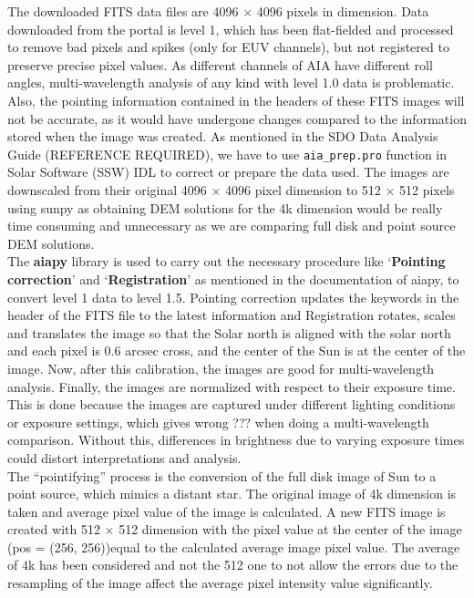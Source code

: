 The downloaded FITS data files are 4096 $\times$ 4096 pixels in dimension. Data downloaded from the portal is level 1, which has been flat-fielded and processed to remove bad pixels and spikes (only for EUV channels), but not registered to preserve precise pixel values. As different channels of AIA have different roll angles, multi-wavelength analysis of any kind with level 1.0 data is problematic. Also, the pointing information contained in the headers of these FITS images will not be accurate, as it would have undergone changes compared to the information stored when the image was created. As mentioned in the SDO Data Analysis Guide (REFERENCE REQUIRED), we have to use \texttt{aia\_prep.pro} function in Solar Software (SSW) IDL to correct or prepare the data used. The images are downscaled from their original 4096 $\times$ 4096 pixel dimension to 512 $\times$ 512 pixels using sunpy as obtaining DEM solutions for the 4k dimension would be really time consuming and unnecessary as we are comparing full disk and point source DEM solutions.\\

The \textbf{aiapy} library is used to carry out the necessary procedure like `\textbf{Pointing correction}' and `\textbf{Registration}' as mentioned in the documentation of aiapy, to convert level 1 data to level 1.5. Pointing correction updates the keywords in the header of the FITS file to the latest information and Registration rotates, scales and translates the image so that the Solar north is aligned with the solar north and each pixel is 0.6 arcsec cross, and the center of the Sun is at the center of the image. Now, after this calibration, the images are good for multi-wavelength analysis. Finally, the images are normalized with respect to their exposure time. This is done because the images are captured under different lighting conditions or exposure settings, which gives wrong ??? when doing a multi-wavelength comparison. Without this, differences in brightness due to varying exposure times could distort interpretations and analysis.\\

The ``pointifying'' process is the conversion of the full disk image of Sun to a point source, which mimics a distant star. The original image of 4k dimension is taken and average pixel value of the image is calculated. A new FITS image is created with 512 $\times$ 512 dimension with the pixel value at the center of the image (pos = (256, 256))equal to the calculated average image pixel value. The average of 4k has been considered and not the 512 one to not allow the errors due to the resampling of the image affect the average pixel intensity value significantly.

